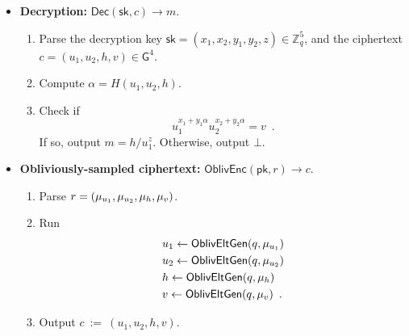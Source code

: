 \documentclass[11pt,letterpaper]{article}
\theoremstyle{plain} %
\theoremstyle{definition} %
\theoremstyle{remark} %
\newcommand{\eqdef}{\ {:=} \ }
\newcommand{\OblivEnc}{\mathsf{OblivEnc}}
\newcommand{\Dec}{\mathsf{Dec}}
\newcommand{\EncKey}{\mathsf{pk}}
\newcommand{\DecKey}{\mathsf{sk}}
\newcommand{\Msg}{m}
\newcommand{\Ciphertext}{c}
\newcommand{\Rand}{r}
\newcommand{\Integers}{\mathbb{Z}}
\newcommand{\Group}{\mathsf{G}}
\newcommand{\GrpOrd}{q}
\newcommand{\GrpEltE}{h}
\newcommand{\GrpEltU}{u}
\newcommand{\GrpEltV}{v}
\newcommand{\Hash}{H}
\newcommand{\ExpX}{x}
\newcommand{\ExpY}{y}
\newcommand{\ExpZ}{z}
\newcommand{\Tag}{\alpha}
\begin{document}
\begin{itemize}[nolistsep]
    \item \textbf{Decryption:} $\Dec(\DecKey, \Ciphertext) \to \Msg$.
    \begin{enumerate}[nolistsep]
        \item Parse the decryption key $\DecKey = (\ExpX_1, \ExpX_2, \ExpY_1, \ExpY_2, \ExpZ) \in \Integers_{\GrpOrd}^5$, and the ciphertext $\Ciphertext = (\GrpEltU_1, \GrpEltU_2, \GrpEltE, \GrpEltV) \in \Group^4$.
        \item Compute $\Tag = \Hash(\GrpEltU_1, \GrpEltU_2, \GrpEltE)$.
        \item Check if
        \begin{equation*}
            \GrpEltU_1^{\ExpX_1 + \ExpY_1 \Tag} \GrpEltU_2^{\ExpX_2 + \ExpY_2 \Tag}
            = \GrpEltV
            \enspace.
        \end{equation*} If so, output $\Msg = \GrpEltE / \GrpEltU_1^{\ExpZ}$. Otherwise, output $\bot$.
    \end{enumerate}

    \item \textbf{Obliviously-sampled ciphertext:} $\OblivEnc(\EncKey, \Rand) \to \Ciphertext$.
    \begin{enumerate}[nolistsep]
        \item Parse $\Rand = (\RandStr_{\GrpEltU_1}, \RandStr_{\GrpEltU_2}, \RandStr_{\GrpEltE}, \RandStr_{\GrpEltV})$.
        \item Run
        \begin{align*}
            &\GrpEltU_1 \gets \OblivEltGen(\GrpOrd, \RandStr_{\GrpEltU_1})\\
            &\GrpEltU_2 \gets \OblivEltGen(\GrpOrd, \RandStr_{\GrpEltU_2})\\
            &\GrpEltE \gets \OblivEltGen(\GrpOrd, \RandStr_{\GrpEltE})\\
            &\GrpEltV \gets \OblivEltGen(\GrpOrd, \RandStr_{\GrpEltV})
            \enspace.
        \end{align*}
        \item Output $\Ciphertext \eqdef (\GrpEltU_1,\GrpEltU_2,\GrpEltE,\GrpEltV)$.
    \end{enumerate}


\end{itemize}
\end{document}
